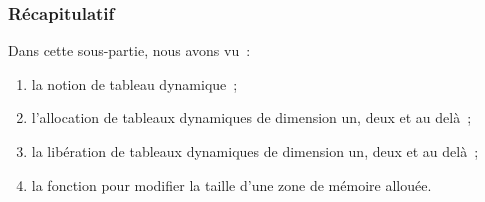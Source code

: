 \begin{frame}[fragile] \frametitle{Récapitulatif}
Dans cette sous-partie, nous avons vu~:

\begin{enumerate}
    \item la notion de tableau dynamique~;
    \smallskip

    \item l'allocation de tableaux dynamiques de dimension un, deux et au
    delà~;
    \smallskip

    \item la libération de tableaux dynamiques de dimension un, deux et
    au delà~;
    \smallskip

    \item la fonction  pour modifier la taille d'une
    zone de mémoire allouée.
\end{enumerate}
\end{frame}
